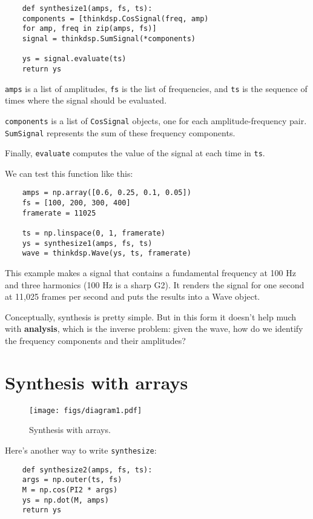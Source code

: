 \begin{verbatim}
	def synthesize1(amps, fs, ts):
	components = [thinkdsp.CosSignal(freq, amp)
	for amp, freq in zip(amps, fs)]
	signal = thinkdsp.SumSignal(*components)
	
	ys = signal.evaluate(ts)
	return ys
\end{verbatim}

{\tt amps} is a list of amplitudes, {\tt fs} is the list
of frequencies, and {\tt ts} is the sequence
of times where the signal should be evaluated.

{\tt components} is a list of {\tt CosSignal} objects, one for
each amplitude-frequency pair.  {\tt SumSignal} represents the
sum of these frequency components.

Finally, {\tt evaluate} computes the value of the signal at each
time in {\tt ts}.

We can test this function like this:

\begin{verbatim}
	amps = np.array([0.6, 0.25, 0.1, 0.05])
	fs = [100, 200, 300, 400]
	framerate = 11025
	
	ts = np.linspace(0, 1, framerate)
	ys = synthesize1(amps, fs, ts)
	wave = thinkdsp.Wave(ys, ts, framerate)
\end{verbatim}

This example makes a signal that contains a fundamental frequency at
100 Hz and three harmonics (100 Hz is a sharp G2).  It renders the
signal for one second at 11,025 frames per second and puts the results
into a Wave object.

Conceptually, synthesis is pretty simple.  But in this form it doesn't
help much with {\bf analysis}, which is the inverse problem: given the
wave, how do we identify the frequency components and their amplitudes?


\section{Synthesis with arrays}
\label{synthesis}

\begin{figure}
	\centerline{\texttt{[image: figs/diagram1.pdf]}}
	\caption{Synthesis with arrays.}
	\label{fig.synthesis}
\end{figure}

Here's another way to write {\tt synthesize}:

\begin{verbatim}
	def synthesize2(amps, fs, ts):
	args = np.outer(ts, fs)
	M = np.cos(PI2 * args)
	ys = np.dot(M, amps)
	return ys
\end{verbatim}

